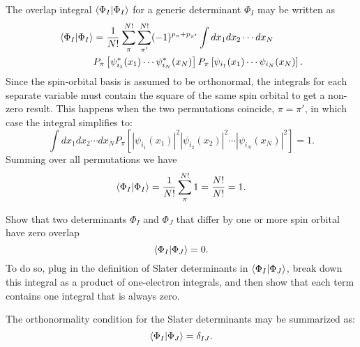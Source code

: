 \documentclass[../Main/chem532-notes.tex]{subfiles}
\begin{document}
The overlap integral $\braket{\Phi_I|\Phi_I}$ for a generic determinant $\Phi_I$ may be written as
\begin{equation}
\begin{split}
\braket{\Phi_I|\Phi_I} &= \frac{1}{N!}
\sum_{\pi}^{N!} \sum_{\pi'}^{N!} (-1)^{p_\pi + p_{\pi'}} \int dx_1 dx_2 \cdots dx_N \\
&
P_{\pi}\left[
\psi_{i_1}^{*}(x_1) \cdots \psi_{i_N}^{*}(x_N)
\right]
P_{\pi}\left[
\psi_{i_1}(x_1) \cdots \psi_{i_N}(x_N)
\right].
\end{split}
\end{equation}
Since the spin-orbital basis is assumed to be orthonormal, the integrals for each separate variable must contain the square of the same spin orbital to get a non-zero result.
This happens when the two permutations coincide, $\pi = \pi'$, in which case the integral simplifies to:
\begin{equation}
 \int dx_1 dx_2 \cdots dx_N 
P_{\pi}\left[
|\psi_{i_1}(x_1)|^2 |\psi_{i_2}(x_2)|^2 \cdots |\psi_{i_N}(x_N)|^2
\right] = 1.
\end{equation}
Summing over all permutations we have
\begin{equation}
\braket{\Phi_I | \Phi_I} = \frac{1}{N!}
\sum_{\pi}^{N!} 1 =  \frac{N!}{N!} = 1.
\end{equation}

\begin{problem}
Show that two determinants $\Phi_I$ and $\Phi_J$ that differ by one or more spin orbital have zero overlap
\begin{equation}
\braket{\Phi_I | \Phi_J} = 0.
\end{equation}
To do so, plug in the definition of Slater determinants in $\braket{\Phi_I | \Phi_J}$, break down this integral as a product of one-electron integrals, and then show that each term contains one integral that is always zero.
\end{problem}
The orthonormality condition for the Slater determinants may be summarized as:
\begin{equation}
\braket{\Phi_I | \Phi_J} = \delta_{IJ}.
\end{equation}
\end{document}
